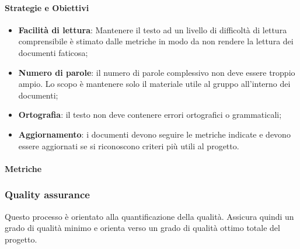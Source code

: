             \paragraph{Strategie e Obiettivi}
            \begin{itemize}
                \item \textbf{Facilità di lettura}: Mantenere il testo ad un livello di difficoltà di lettura comprensibile è stimato dalle metriche in modo da non rendere la lettura dei documenti faticosa;
                \item \textbf{Numero di parole}: il numero di parole complessivo non deve essere troppio ampio. Lo scopo è mantenere solo il materiale utile al gruppo all'interno dei documenti;
                \item \textbf{Ortografia}: il testo non deve contenere errori ortografici o grammaticali;
                \item \textbf{Aggiornamento}: i documenti devono seguire le metriche indicate e devono essere aggiornati se si riconoscono criteri più utili al progetto.
            \end{itemize}
    \newpage
            \paragraph{Metriche}
            
            \hphantom{}
         \def\productquality{
                           {   Gulpease index,
                                $89 + (300*Frasi - 10*\frac{Lettere}{Parole}$, 
                                $40 < IG \leq 100$,
                                $80 < IG \leq 100$
                            },
                            {   Correttezza ortografica,
                                numero totale di errori, 
                                0,
                                0
                            },
                        }
                    
                    
                    
            \subsubsection{Quality assurance}
            Questo processo è orientato alla quantificazione della qualità. Assicura quindi un grado di qualità minimo e orienta verso un grado di qualità ottimo totale del progetto.
            
